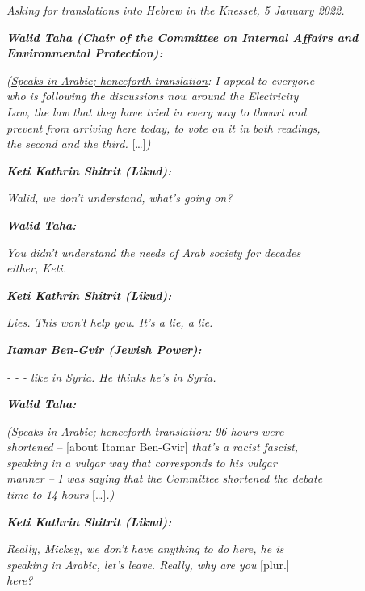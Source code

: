 \documentclass[output=paper,arabicfont]{langscibook}
\begin{document}
\begin{exe}\ex\label{hawker:ex3}
\textit{Asking for translations into Hebrew in the Knesset, 5 January 2022.}\\

\begin{linenumbers*}
\textbf{\textit{Walid Taha (Chair of the Committee on Internal Affairs and\\
Environmental Protection):}}

\textit{(\ul{Speaks in Arabic; henceforth translation}: I appeal to everyone \\
who is following the discussions now around the Electricity \\
Law, the law that they have tried in every way to thwart and \\
prevent from arriving here today, to vote on it in both readings, \\
the second and the third. }[…]\textit{)}

\textbf{\textit{Keti Kathrin Shitrit (Likud):}}

\textit{Walid, we don’t understand, what’s going on?}

\textbf{\textit{Walid Taha:}}

\textit{You didn’t understand the needs of Arab society for decades \\
either, Keti.}

\textbf{\textit{Keti Kathrin Shitrit (Likud):}}

\textit{Lies. This won’t help you. It’s a lie, a lie.}

\textbf{\textit{Itamar Ben-Gvir (Jewish Power):}}

\textit{- - - like in Syria. He thinks he’s in Syria.}

\textbf{\textit{Walid Taha:}}

\textit{(\ul{Speaks in Arabic; henceforth translation}: 96 hours were\\
shortened} – [about Itamar Ben-Gvir] \textit{that’s a racist fascist,\\
speaking in a vulgar way that corresponds to his vulgar\\
manner – I was saying that the Committee shortened the debate\\
time to 14 hours }[…]\textit{.)}

\textbf{\textit{Keti Kathrin Shitrit (Likud):}}

\textit{Really, Mickey, we don’t have anything to do here, he is\\
speaking in Arabic, let’s leave. Really, why are you} [plur.] \\
\textit{here?}


\end{linenumbers*}
\end{exe}
\end{document}

